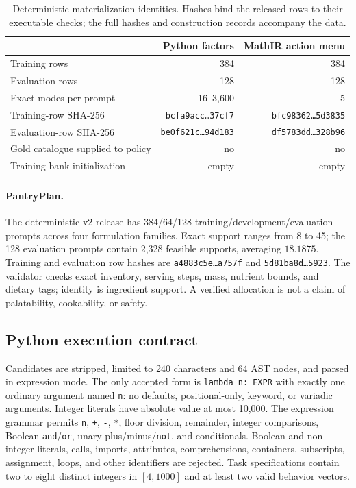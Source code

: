\documentclass{article}
\newcommand{\1}{\mathbf 1}
\theoremstyle{remark}
\theoremstyle{definition}
\theoremstyle{plain}
\begin{document}
\begin{table}[H]
\centering
\caption{Deterministic materialization identities. Hashes bind the released rows to their executable checks; the full hashes and construction records accompany the data.}
\label{tab:materialization-identities}
\small
\begin{tabular}{@{}lrr@{}}
\toprule
& \textbf{Python factors} & \textbf{MathIR action menu} \\
\midrule
Training rows & 384 & 384 \\
Evaluation rows & 128 & 128 \\
Exact modes per prompt & 16--3,600 & 5 \\
Training-row SHA-256 & \texttt{bcfa9acc\ldots37cf7} & \texttt{bfc98362\ldots5d3835} \\
Evaluation-row SHA-256 & \texttt{be0f621c\ldots94d183} & \texttt{df5783dd\ldots328b96} \\
Gold catalogue supplied to policy & no & no \\
Training-bank initialization & empty & empty \\
\bottomrule
\end{tabular}
\end{table}

\paragraph{PantryPlan.}
\label{app:data-pantry}
The deterministic v2 release has 384/64/128 training/development/evaluation
prompts across four formulation families. Exact support ranges from 8 to 45;
the 128 evaluation prompts contain 2,328 feasible supports, averaging
$18.1875$. Training and evaluation row hashes are
\texttt{a4883c5e\ldots a757f} and \texttt{5d81ba8d\ldots5923}.
The validator checks exact inventory, serving steps, mass, nutrient bounds,
and dietary tags; identity is ingredient support. A verified allocation is
not a claim of palatability, cookability, or safety.

\subsection{Python execution contract}
\label{app:python}
\label{app:python-language}

Candidates are stripped, limited to 240 characters and 64 AST nodes, and
parsed in expression mode. The only accepted form is \texttt{lambda n: EXPR}
with exactly one ordinary argument named \texttt{n}: no defaults,
positional-only, keyword, or variadic arguments. Integer literals have
absolute value at most 10,000. The expression grammar permits \texttt{n},
\texttt{+}, \texttt{-}, \texttt{*}, floor division, remainder, integer
comparisons, Boolean \texttt{and}/\texttt{or}, unary plus/minus/\texttt{not},
and conditionals. Boolean and non-integer literals, calls, imports,
attributes, comprehensions, containers, subscripts, assignment, loops, and
other identifiers are rejected. Task specifications contain two to eight
distinct integers in $[4,1000]$ and at least two valid behavior vectors.
\end{document}
